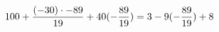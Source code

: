 \documentclass[preview]{standalone}
\begin{document}
\begin{align*}
\special{dvisvgm:raw <g id='unique000'>}100 + \frac{(-30) \cdot -89}{19} + 40 (- \frac{89}{19}) = 3 - 9 (- \frac{89}{19}) + 8\special{dvisvgm:raw </g>}
\end{align*}
\end{document}
